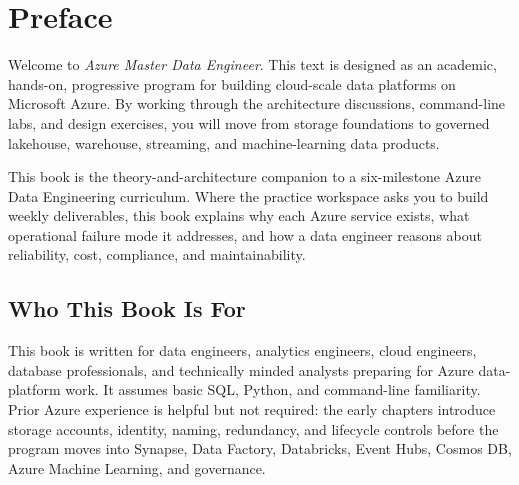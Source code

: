 \chapter*{Preface}
Welcome to \textit{Azure Master Data Engineer}. This text is designed as an academic, hands-on, progressive program for building cloud-scale data platforms on Microsoft Azure. By working through the architecture discussions, command-line labs, and design exercises, you will move from storage foundations to governed lakehouse, warehouse, streaming, and machine-learning data products.

This book is the theory-and-architecture companion to a six-milestone Azure Data Engineering curriculum. Where the practice workspace asks you to build weekly deliverables, this book explains why each Azure service exists, what operational failure mode it addresses, and how a data engineer reasons about reliability, cost, compliance, and maintainability.

\section*{Who This Book Is For}
This book is written for data engineers, analytics engineers, cloud engineers, database professionals, and technically minded analysts preparing for Azure data-platform work. It assumes basic SQL, Python, and command-line familiarity. Prior Azure experience is helpful but not required: the early chapters introduce storage accounts, identity, naming, redundancy, and lifecycle controls before the program moves into Synapse, Data Factory, Databricks, Event Hubs, Cosmos DB, Azure Machine Learning, and governance.

